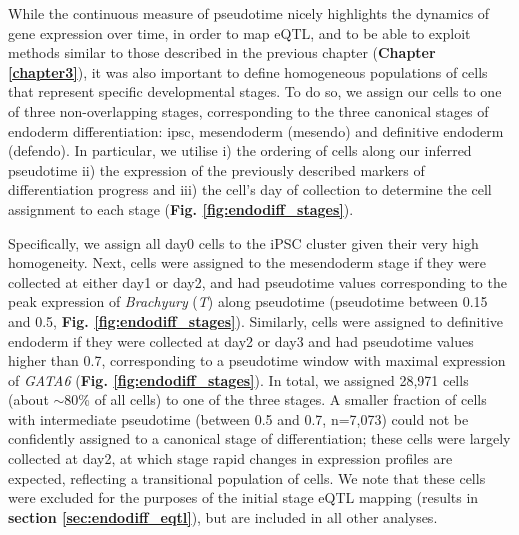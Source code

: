 While the continuous measure of pseudotime nicely highlights the dynamics of gene expression over time, in order to map eQTL, and to be able to exploit methods similar to those described in the previous chapter (\textbf{Chapter 
\ref{chapter3}}),
it was also important to define homogeneous populations of cells that represent specific developmental stages.
To do so, we assign our cells to one of three non-overlapping stages, corresponding to the three canonical stages of endoderm differentiation: \gls{ipsc}, mesendoderm (mesendo) and definitive endoderm (defendo).
In particular, we utilise i) the ordering of cells along our inferred pseudotime ii) the expression of the previously described markers of differentiation progress and iii) the cell's day of collection to determine the cell assignment to each stage (\textbf{Fig. \ref{fig:endodiff_stages}}).

Specifically, we assign all day0 cells to the iPSC cluster given their very high homogeneity.
Next, cells were assigned to the mesendoderm stage if they were collected at either day1 or day2, and had pseudotime values corresponding to the peak expression of \textit{Brachyury} (\textit{T}) along pseudotime (pseudotime between 0.15 and 0.5, \textbf{Fig. \ref{fig:endodiff_stages}}).  
Similarly, cells were assigned to definitive endoderm if they were collected at day2 or day3 and had pseudotime values higher than 0.7, corresponding to a pseudotime window with maximal expression of \textit{GATA6} (\textbf{Fig. \ref{fig:endodiff_stages}}).
In total, we assigned 28,971 cells (about $\sim$80\% of all cells) to one of the three stages. 
A smaller fraction of cells with intermediate pseudotime (between 0.5 and 0.7, n=7,073) could not be confidently assigned to a canonical stage of differentiation; these cells were largely collected at day2, at which stage rapid changes in expression profiles are expected, reflecting a transitional population of cells.
We note that these cells were excluded for the purposes of the initial stage eQTL mapping (results in \textbf{section \ref{sec:endodiff_eqtl}}), but are included in all other analyses. 

\vspace{2mm}

